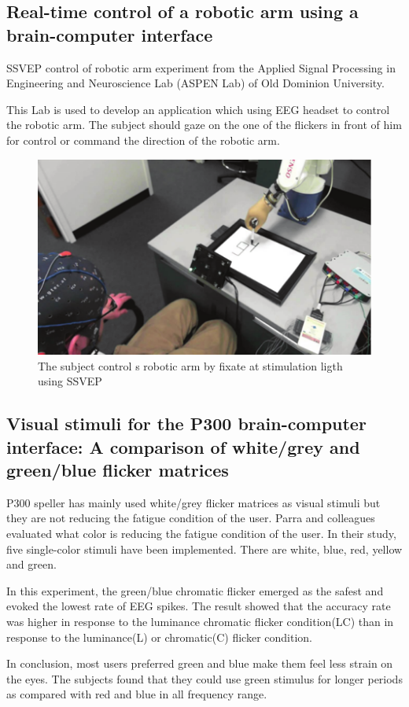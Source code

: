 \subsection {Real-time control of a robotic arm using a brain-computer interface\cite{ref2}}

\hspace{1.5cm} SSVEP control of robotic arm experiment from the Applied Signal Processing in Engineering and Neuroscience Lab (ASPEN Lab) of Old Dominion University.\par
This Lab is used to develop an application which using EEG headset to control the robotic arm. The subject should gaze on the one of the flickers in front of him for control or command the direction of the robotic arm.
\begin{figure}[ht]
	\centering
  	\includegraphics[scale = 0.70]{chapter2/22.pdf}
  	\caption{The subject control s robotic arm by fixate at stimulation ligth using SSVEP}
\end{figure}
\newpage

\subsection {Visual stimuli for the P300 brain-computer interface: A comparison of white/grey and green/blue flicker matrices\cite{ref3}}

\hspace{1.5cm}  P300 speller has mainly used white/grey flicker matrices as visual stimuli but they are not reducing the fatigue condition of the user. Parra and colleagues evaluated what color is reducing the fatigue condition of the user. In their study, five single-color stimuli have been implemented. There are white, blue, red, yellow and green.\par
In this experiment, the green/blue chromatic flicker emerged as the safest and evoked the lowest rate of EEG spikes. The result showed that the accuracy rate was higher in response to the luminance chromatic flicker condition(LC) than in response to the luminance(L) or chromatic(C) flicker condition.\par
In conclusion, most users preferred green and blue make them feel less strain on the eyes. The subjects found that they could use green stimulus for longer periods as compared with red and blue in all frequency range.

